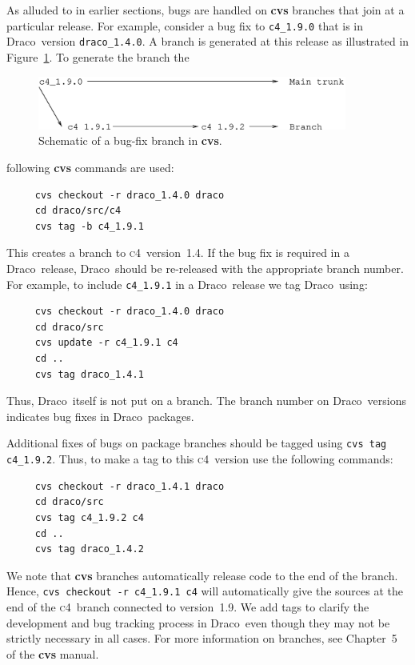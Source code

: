 \documentclass[11pt]{nmemo}
\newcommand{\draco}{{\normalfont\normalsize\textsf Draco}}
\newcommand{\cfour}{{\normalfont\normalsize\scshape c\small 4}}
\begin{document}
As alluded to in earlier sections, bugs are handled on {\bf cvs}
branches that join at a particular release.  For example, consider a
bug fix to \texttt{c4\_1.9.0} that is in \draco\ version
\texttt{draco\_1.4.0}.  A branch is generated at this release as
illustrated in Figure~\ref{fig:branch}.  To generate the branch the
\begin{figure}
  \centerline{\includegraphics[width=4in]{branch.eps}}
  \caption{Schematic of a bug-fix branch in {\bf cvs}.}
  \label{fig:branch}
\end{figure}
following {\bf cvs} commands are used:
\begin{verbatim}
     cvs checkout -r draco_1.4.0 draco
     cd draco/src/c4
     cvs tag -b c4_1.9.1
\end{verbatim}
This creates a branch to \cfour\ version~1.4.  If the bug fix is
required in a \draco\ release, \draco\ should be re-released with the
appropriate branch number.  For example, to include \texttt{c4\_1.9.1}
in a \draco\ release we tag \draco\ using:
\begin{verbatim}
     cvs checkout -r draco_1.4.0 draco
     cd draco/src
     cvs update -r c4_1.9.1 c4
     cd ..
     cvs tag draco_1.4.1
\end{verbatim}
Thus, \draco\ itself is not put on a branch.  The branch number on
\draco\ versions indicates bug fixes in \draco\ packages.

Additional fixes of bugs on package branches should be tagged using
\texttt{cvs tag c4\_1.9.2}.  Thus, to make a tag to this \cfour\ 
version use the following commands:
\begin{verbatim}
     cvs checkout -r draco_1.4.1 draco
     cd draco/src
     cvs tag c4_1.9.2 c4
     cd ..
     cvs tag draco_1.4.2
\end{verbatim}
We note that {\bf cvs} branches automatically release code to the end
of the branch.  Hence, \texttt{cvs checkout -r c4\_1.9.1 c4} will
automatically give the sources at the end of the \cfour\ branch
connected to version~1.9.  We add tags to clarify the development and
bug tracking process in \draco\ even though they may not be strictly
necessary in all cases.  For more information on branches, see
Chapter~5 of the {\bf cvs} manual.

\end{document}
